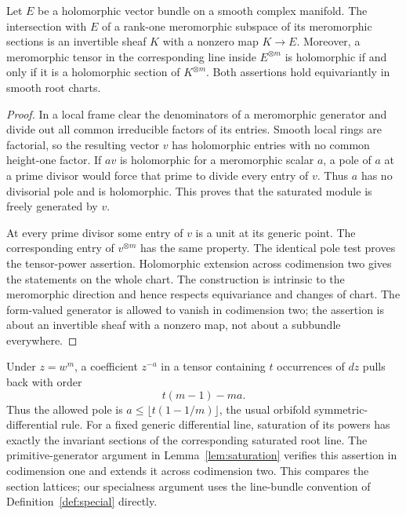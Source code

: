 \begin{lemma}\label{lem:saturation}
Let $E$ be a holomorphic vector bundle on a smooth complex manifold. The intersection with $E$ of a rank-one meromorphic subspace of its meromorphic sections is an invertible sheaf $K$ with a nonzero map $K\to E$. Moreover, a meromorphic tensor in the corresponding line inside $E^{\otimes m}$ is holomorphic if and only if it is a holomorphic section of $K^{\otimes m}$. Both assertions hold equivariantly in smooth root charts.
\end{lemma}

\begin{proof}
In a local frame clear the denominators of a meromorphic generator and divide out all common irreducible factors of its entries. Smooth local rings are factorial, so the resulting vector $v$ has holomorphic entries with no common height-one factor. If $av$ is holomorphic for a meromorphic scalar $a$, a pole of $a$ at a prime divisor would force that prime to divide every entry of $v$. Thus $a$ has no divisorial pole and is holomorphic. This proves that the saturated module is freely generated by $v$.

At every prime divisor some entry of $v$ is a unit at its generic point. The corresponding entry of $v^{\otimes m}$ has the same property. The identical pole test proves the tensor-power assertion. Holomorphic extension across codimension two gives the statements on the whole chart. The construction is intrinsic to the meromorphic direction and hence respects equivariance and changes of chart. The form-valued generator is allowed to vanish in codimension two; the assertion is about an invertible sheaf with a nonzero map, not about a subbundle everywhere.
\end{proof}

\begin{remark}\label{rem:conventions}
Under $z=w^m$, a coefficient $z^{-a}$ in a tensor containing $t$ occurrences of $dz$ pulls back with order
\[
 t(m-1)-ma.
\]
Thus the allowed pole is $a\le\lfloor t(1-1/m)\rfloor$, the usual orbifold symmetric-differential rule. For a fixed generic differential line, saturation of its powers has exactly the invariant sections of the corresponding saturated root line. The primitive-generator argument in Lemma~\ref{lem:saturation} verifies this assertion in codimension one and extends it across codimension two. This compares the section lattices; our specialness argument uses the line-bundle convention of Definition~\ref{def:special} directly.
\end{remark}

